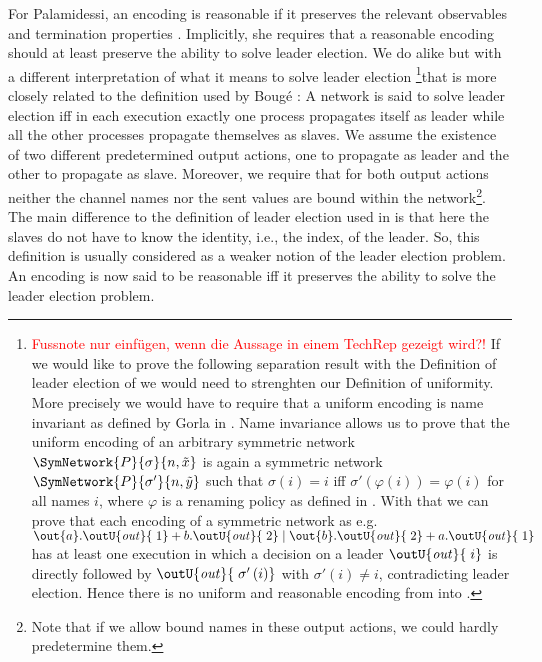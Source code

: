 \documentclass[11pt,techReport]{eptcs}
\begin{document}
For Palamidessi, an encoding is reasonable if it preserves the relevant observables and termination properties \cite{palamidessi03}. Implicitly, she requires that a reasonable encoding should at least preserve the ability to solve leader election. We  do alike but with a different interpretation of what it means to solve leader election \ifadraft\footnote{\textcolor{red}{Fussnote nur einfügen, wenn die Aussage in einem TechRep gezeigt wird?!} If we would like to prove the following separation result with the Definition of leader election of \cite{palamidessi03} we would need to strenghten our Definition of uniformity. More precisely we would have to require that a uniform encoding is name invariant as defined by Gorla in \cite{gorla08d}. Name invariance allows us to prove that the uniform encoding of an arbitrary symmetric network $ \SymNetwork{P}{\sigma}{n, \tilde{x}} $ is again a symmetric network $ \SymNetwork{P}{\sigma'}{n, \tilde{y}} $ such that $ \sigma\left( i \right) = i $ iff $ \sigma'\left( \varphi\left( i \right) \right) = \varphi\left( i \right) $ for all names $ i $, where $ \varphi $ is a renaming policy as defined in \cite{gorla08d}. With that we can prove that each encoding of a symmetric network as e.g. $ \out{a}.\outU{\mathit{out}}{\; 1} + b.\outU{\mathit{out}}{\; 2} \mid \out{b}.\outU{\mathit{out}}{\; 2} + a.\outU{\mathit{out}}{\; 1} $ has at least one execution in which a decision on a leader $ \outU{\mathit{out}}{\; i} $ is directly followed by $ \outU{\mathit{out}}{\; \sigma'\left( i \right)} $ with $ \sigma'\left( i \right) \neq i $, contradicting leader election. Hence there is no uniform and reasonable encoding from \pimix into \pisep.}\fi that is more closely related to the definition used by Boug\'{e} \cite{bouge88}:
A network is said to solve leader election iff in each execution exactly one process propagates itself as leader while all the other processes propagate themselves as slaves. We assume the existence of two different predetermined output actions, one to propagate as leader and the other to propagate as slave. Moreover, we require that for both output actions neither the channel names nor the sent values are bound within the network\footnote{Note that if we allow bound names in these output actions, we could hardly predetermine them.}. The main difference to the definition of leader election used in \cite{palamidessi03} is that here the slaves do not have to know the identity, i.e., the index, of the leader. So, this definition is usually considered as a weaker notion of the leader election problem.  An encoding is now said to be reasonable iff it preserves the ability to solve the leader election problem.
\end{document}
